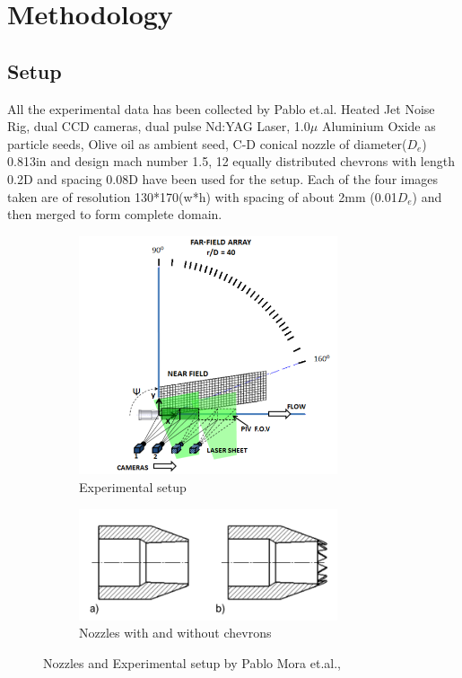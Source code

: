 %
%

\chapter{Methodology}

\section{Setup}

All the experimental data has been collected by Pablo et.al\cite{pablo}. Heated Jet Noise Rig, dual CCD cameras, dual pulse Nd:YAG Laser, 1.0$\mu$ Aluminium Oxide as particle seeds, Olive oil as ambient seed,  C-D conical nozzle of diameter($D_e$) 0.813in and design mach number 1.5, 12 equally distributed chevrons with length 0.2D and spacing 0.08D have been used for the setup. Each of the four images taken are of resolution 130*170(w*h) with spacing of about 2mm (0.01$D_e$) and then merged to form complete domain. \\

\begin{figure}[H]
\begin{subfigure}{.5\textwidth}
	\centering
	\includegraphics[width=3in]{images/setup.png}
	\caption{Experimental setup}
	\label{fig:setup1}
\end{subfigure}%
\begin{subfigure}{.5\textwidth}
	\centering
	\includegraphics[width=3in]{images/nozzles.png}
	\caption{Nozzles with and without chevrons}
	\label{fig:setup2}
\end{subfigure}
\caption{Nozzles and Experimental setup by Pablo Mora et.al.,}
\label{fig:setup}
\end{figure}

